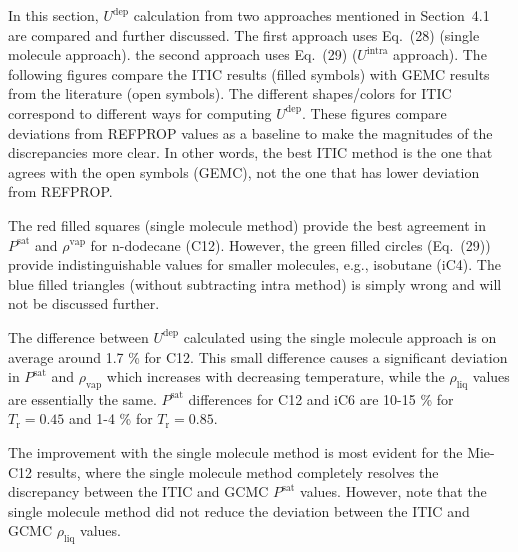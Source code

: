 \documentclass[%
 aip,
 jcp,
 sd,%
 amsmath,amssymb,
]{revtex4-1}
\begin{document}

In this section, $U^\mathrm{dep}$ calculation from two approaches mentioned in Section~4.1 are compared and further discussed. The first approach uses Eq.~(28) (single molecule approach). the second approach uses Eq.~(29) ($U^\mathrm{intra}$ approach). The following figures compare the ITIC results (filled symbols) with GEMC results from the literature (open symbols). The different shapes/colors for ITIC correspond to different ways for computing $U^\mathrm{dep}$. These figures compare deviations from REFPROP values as a baseline to make the magnitudes of the discrepancies more clear. In other words, the best ITIC method is the one that agrees with the open symbols (GEMC), not the one that has lower deviation from REFPROP.

The red filled squares (single molecule method) provide the best agreement in $P^\mathrm{sat}$ and $\rho^\mathrm{vap}$ for n-dodecane (C12). However, the green filled circles (Eq.~(29)) provide indistinguishable values for smaller molecules, e.g., isobutane (iC4). The blue filled triangles (without subtracting intra method) is simply wrong and will not be discussed further.

The difference between $U^\mathrm{dep}$ calculated using the single molecule approach is on average around 1.7 \% for C12. This small difference causes a significant deviation in $P^\mathrm{sat}$ and $\rho_\mathrm{vap}$ which increases with decreasing temperature, while the $\rho_\mathrm{liq}$ values are essentially the same. $P^\mathrm{sat}$ differences for C12 and iC6 are 10-15 \% for $T_\mathrm{r}=0.45$ and 1-4 \% for $T_\mathrm{r}=0.85$. 

The improvement with the single molecule method is most evident for the Mie-C12 results, where the single molecule method completely resolves the discrepancy between the ITIC and GCMC $P^\mathrm{sat}$ values. However, note that the single molecule method did not reduce the deviation between the ITIC and GCMC $\rho_\mathrm{liq}$ values. 
\end{document}
